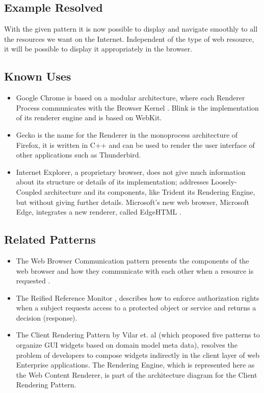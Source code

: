 \documentclass[prodmode,acmtecs]{acmsmall}
\begin{document}
  \subsection*{Example Resolved}
With the given pattern it is now possible to display and navigate smoothly to all the resources we want on the Internet. Independent of the type of web resource, it will be possible to display it appropriately in the browser. 
  \subsection*{Known Uses}
  \begin{itemize}\leftskip0.2em
    \item Google Chrome is based on a modular architecture, where each Renderer Process communicates with the Browser Kernel \cite{multiProcGC}. Blink is the implementation of its renderer engine and is based on WebKit.
    \item Gecko \cite{gecko2} is the name for the Renderer in the monoprocess architecture of Firefox, it is written in C++ and can be used to render the user interface of other applications such as Thunderbird.
    \item Internet Explorer, a proprietary browser, does not give much information about its structure or details of its implementation; \cite{Crowley2010} addresses Loosely-Coupled architecture \cite{IE8-LCIE} and its components, like Trident its Rendering Engine, but without giving further details. Microsoft's new web browser, Microsoft Edge, integrates a new renderer, called EdgeHTML \cite{edgehtml}.
  \end{itemize}

  \subsection*{Related Patterns}
  \begin{itemize}\leftskip0.2em
    \item The Web Browser Communication pattern presents the components of the web browser and how they communicate with each other when a resource is requested \cite{silva2015}. 
    \item The Reified Reference Monitor \cite{fernandez2013security}, describes how to enforce authorization rights when a subject requests access to a protected object or service and returns a decision (response). 
    \item The Client Rendering Pattern by Vilar et. al \cite{Vilar2015} (which proposed five patterns to organize GUI widgets based on domain model meta data), resolves the problem of developers to compose widgets indirectly in the client layer of web Enterprise applications. The Rendering Engine, which is represented here as the Web Content Renderer, is part of the architecture diagram for the Client Rendering Pattern.
  \end{itemize}
\end{document}
